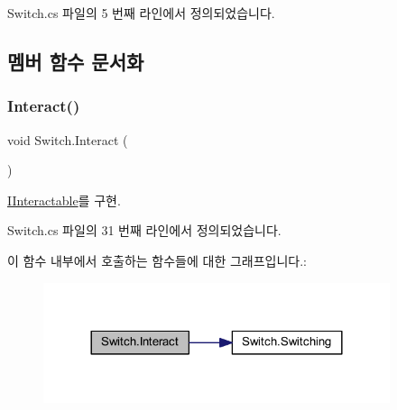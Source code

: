 Switch.\+cs 파일의 5 번째 라인에서 정의되었습니다.



\subsection{멤버 함수 문서화}
\mbox{\label{class_switch_ae6359a4d03949a03a05f119273778e08}} 
\subsubsection{\texorpdfstring{Interact()}{Interact()}}
{\footnotesize\ttfamily void Switch.\+Interact (\begin{DoxyParamCaption}{ }\end{DoxyParamCaption})}



\mbox{\hyperlink{interface_i_interactable_a6e8c9bc1f27bc2a5c81f674ceeac024c}{I\+Interactable}}를 구현.



Switch.\+cs 파일의 31 번째 라인에서 정의되었습니다.


\begin{DoxyCode}{0}

\end{DoxyCode}
이 함수 내부에서 호출하는 함수들에 대한 그래프입니다.\+:\nopagebreak
\begin{figure}[H]
\begin{center}
\leavevmode
\includegraphics[width=288pt]{d9/d47/class_switch_ae6359a4d03949a03a05f119273778e08_cgraph}
\end{center}
\end{figure}
\mbox{\label{class_switch_ae2b801ac5612e717059ef7a68477bb29}} 

